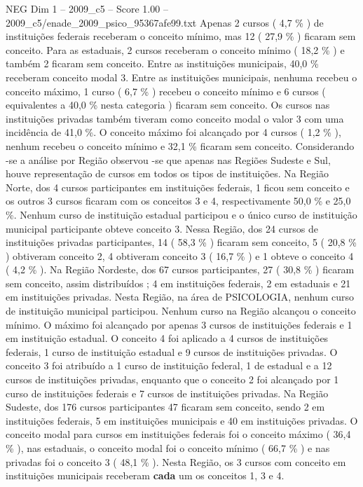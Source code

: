 \begin{textsample}{NEG Dim 1 – 2009\_c5 – Score 1.00 – 2009\_c5/enade\_2009\_psico\_95367afe99.txt}
Apenas 2 cursos ( 4,7 \% ) de instituições federais receberam o conceito mínimo, mas 12 ( 27,9 \% ) ficaram sem conceito.
Para as estaduais, 2 cursos receberam o conceito mínimo ( 18,2 \% ) e também 2 ficaram sem conceito.
Entre as instituições municipais, 40,0 \% receberam conceito modal 3.
Entre as instituições municipais, nenhuma recebeu o conceito máximo, 1 curso ( 6,7 \% ) recebeu o conceito mínimo e 6 cursos ( equivalentes a 40,0 \% nesta categoria ) ficaram sem conceito.
Os cursos nas instituições privadas também tiveram como conceito modal o valor 3 com uma incidência de 41,0 \%.
O conceito máximo foi alcançado por 4 cursos ( 1,2 \% ), nenhum recebeu o conceito mínimo e 32,1 \% ficaram sem conceito.
Considerando -se a análise por Região observou -se que apenas nas Regiões Sudeste e Sul, houve representação de cursos em todos os tipos de instituições.
Na Região Norte, dos 4 cursos participantes em instituições federais, 1 ficou sem conceito e os outros 3 cursos ficaram com os conceitos 3 e 4, respectivamente 50,0 \% e 25,0 \%.
Nenhum curso de instituição estadual participou e o único curso de instituição municipal participante obteve conceito 3.
Nessa Região, dos 24 cursos de instituições privadas participantes, 14 ( 58,3 \% ) ficaram sem conceito, 5 ( 20,8 \% ) obtiveram conceito 2, 4 obtiveram conceito 3 ( 16,7 \% ) e 1 obteve o conceito 4 ( 4,2 \% ).
Na Região Nordeste, dos 67 cursos participantes, 27 ( 30,8 \% ) ficaram sem conceito, assim distribuídos ; 4 em instituições federais, 2 em estaduais e 21 em instituições privadas.
Nesta Região, na área de PSICOLOGIA, nenhum curso de instituição municipal participou.
Nenhum curso na Região alcançou o conceito mínimo.
O máximo foi alcançado por apenas 3 cursos de instituições federais e 1 em instituição estadual.
O conceito 4 foi aplicado a 4 cursos de instituições federais, 1 curso de instituição estadual e 9 cursos de instituições privadas.
O conceito 3 foi atribuído a 1 curso de instituição federal, 1 de estadual e a 12 cursos de instituições privadas, enquanto que o conceito 2 foi alcançado por 1 curso de instituições federais e 7 cursos de instituições privadas.
Na Região Sudeste, dos 176 cursos participantes 47 ficaram sem conceito, sendo 2 em instituições federais, 5 em instituições municipais e 40 em instituições privadas.
O conceito modal para cursos em instituições federais foi o conceito máximo ( 36,4 \% ), nas estaduais, o conceito modal foi o conceito mínimo ( 66,7 \% ) e nas privadas foi o conceito 3 ( 48,1 \% ).
Nesta Região, os 3 cursos com conceito em instituições municipais receberam \textbf{cada} um os conceitos 1, 3 e 4.

\end{textsample}

